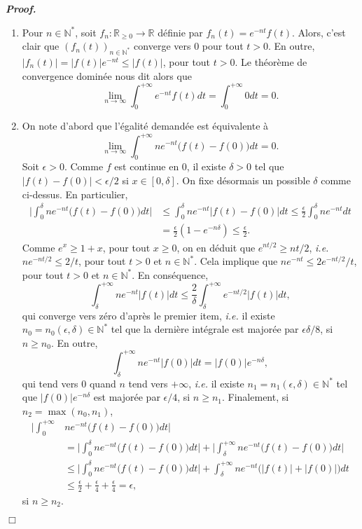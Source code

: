 \documentclass[11pt,a4paper]{article}
\newcommand{\NN}{\mathbb{N}}
\newcommand{\RR}{\mathbb{R}}
\newenvironment{preuve}[1][]
{\vskip 2mm  \noindent\emph{\bf Proof#1. }}{$\Box$ \vskip 2mm}
\let\geq\geqslant
\let\leq\leqslant
\begin{document}
	\begin{preuve}
		\begin{enumerate}
			\item
			Pour $n \in \NN^{*}$, soit $f_{n} : \RR_{\geq 0} \rightarrow \RR$ définie par $f_{n}(t) = e^{-nt} f(t)$. 
			Alors, c'est clair que $(f_{n}(t))_{n \in \NN^{*}}$ converge vers $0$ pour tout $t > 0$. 
			En outre, $|f_{n}(t)| = |f(t)| e^{-nt} \leq |f(t)|$, pour tout $t > 0$.
			Le théorème de convergence dominée nous dit alors que 
			\[     \underset{n \rightarrow \infty}{\lim} \int_0^{+\infty} e^{-nt} f(t) dt = \int_0^{+\infty} 0 dt = 0.     \]
			
			\item 
			On note d'abord que l'égalité demandée est équivalente à 
			\[     \underset{n \rightarrow \infty}{\lim} \int_0^{+\infty} n e^{-nt} \big(f(t) - f(0)\big) dt = 0.     \]
			Soit $\epsilon > 0$. 
			Comme $f$ est continue en $0$, il existe $\delta > 0$ tel que $|f(t) - f(0)| < \epsilon/2$ si $x \in [0,\delta]$. 
			On fixe désormais un possible $\delta$ comme ci-dessus.
			En particulier, 
			\begin{align*}
			\bigg| \int_0^{\delta} n e^{-nt} \big(f(t) - f(0)\big) dt \bigg| &\leq \int_0^{\delta} n e^{-nt} \big|f(t) - f(0)\big| dt \leq \frac{\epsilon}{2} \int_0^{\delta} n e^{-nt} dt \\
			&= \frac{\epsilon}{2} (1 - e^{-n \delta}) \leq  \frac{\epsilon}{2}.  
			\end{align*} 
			Comme $e^{x} \geq 1+x$, pour tout $x \geq 0$, on en déduit que $e^{n t /2} \geq nt/2$, \textit{i.e.} $ne^{-n t /2} \leq 2/t$, pour tout $t >0$ et $n \in \NN^{*}$. 
			Cela implique que $n e^{-nt} \leq 2 e^{- n t /2}/t$, pour tout $t >0$ et $n \in \NN^{*}$. 
			En conséquence, 
			\[     \int_{\delta}^{+\infty} n e^{-nt} |f(t)| dt \leq \frac{2}{{\delta}} \int_{\delta}^{+\infty} e^{-nt/2} |f(t)| dt,     \]
			qui converge vers zéro d'après le premier item, \textit{i.e.} il existe $n_{0}=n_{0}(\epsilon,\delta) \in \NN^{*}$ tel que la dernière intégrale est majorée par $\epsilon \delta/8$, si $n \geq n_{0}$. 
			En outre, 
			\[     \int_{\delta}^{+\infty} n e^{-nt} |f(0)| dt = |f(0)| e^{-n\delta},     \]
			qui tend vers $0$ quand $n$ tend vers $+ \infty$, \textit{i.e.} il existe $n_{1}=n_{1}(\epsilon,\delta) \in \NN^{*}$ tel que $|f(0)| e^{-n\delta}$ est majorée par $\epsilon/4$, si $n \geq n_{1}$. 
			Finalement, si $n_{2} = \operatorname{max}(n_{0},n_{1})$,  
			\begin{align*}
			\bigg| \int_0^{+ \infty} &n e^{-nt} \big(f(t) - f(0)\big) dt \bigg| 
			\\
			&= \bigg| \int_0^{\delta} n e^{-nt} \big(f(t) - f(0)\big) dt \bigg| + 
			\bigg| \int_{\delta}^{+ \infty} n e^{-nt} \big(f(t) - f(0)\big) dt \bigg| 
			\\
			&\leq \bigg| \int_0^{\delta} n e^{-nt} \big(f(t) - f(0)\big) dt \bigg|  + \int_{\delta}^{+ \infty} n e^{-nt} \big(|f(t)| + |f(0)|\big) dt
			\\
			&\leq \frac{\epsilon}{2} + \frac{\epsilon}{4} + \frac{\epsilon}{4} = \epsilon,
			\end{align*} 
			si $n \geq n_{2}$. 
		\end{enumerate}
	\end{preuve}
	
\end{document}
